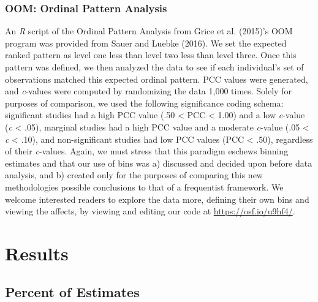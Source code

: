 \documentclass[english,man]{apa6}
\theoremstyle{definition}
\theoremstyle{definition}
\theoremstyle{definition}
\theoremstyle{remark}
\begin{document}
\subsubsection{OOM: Ordinal Pattern
Analysis}\label{oom-ordinal-pattern-analysis}

An \emph{R} script of the Ordinal Pattern Analysis from Grice et al.
(2015)'s OOM program was provided from Sauer and Luebke (2016). We set
the expected ranked pattern as level one less than level two less than
level three. Once this pattern was defined, we then analyzed the data to
see if each individual's set of observations matched this expected
ordinal pattern. PCC values were generated, and \emph{c}-values were
computed by randomizing the data 1,000 times. Solely for purposes of
comparison, we used the following significance coding schema:
significant studies had a high PCC value (.50 \textless{} PCC
\textless{} 1.00) and a low \emph{c}-value (\emph{c} \textless{} .05),
marginal studies had a high PCC value and a moderate \emph{c}-value (.05
\textless{} \emph{c} \textless{} .10), and non-significant studies had
low PCC values (PCC \textless{} .50), regardless of their
\emph{c}-values. Again, we must stress that this paradigm eschews
binning estimates and that our use of bins was a) discussed and decided
upon before data analysis, and b) created only for the purposes of
comparing this new methodologies possible conclusions to that of a
frequentist framework. We welcome interested readers to explore the data
more, defining their own bins and viewing the affects, by viewing and
editing our code at \url{https://osf.io/u9hf4/}.

\section{Results}\label{results}

\subsection{Percent of Estimates}\label{percent-of-estimates}
\end{document}
